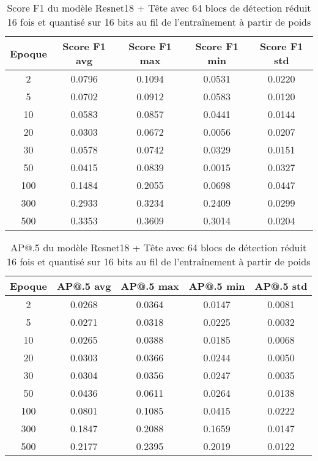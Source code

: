 \begin{table}[!ht]
    \caption{Score F1 du modèle Resnet18 + Tête avec 64 blocs de détection réduit 16 fois et quantisé sur 16 bits au fil de l'entraînement à partir de poids}
    \label{tab:qresnet18+head_64n_reduced_16x_f1score_16b_from_weights}
    \centering
    \begin{tabular}{ |c||c|c|c|c|  }
        \hline
        \rowcolor{gray!50}
        Epoque & Score F1 avg & Score F1 max & Score F1 min & Score F1 std\\
        \hline
        2 & 0.0796 & 0.1094 & 0.0531 & 0.0220\\
        5 & 0.0702 & 0.0912 & 0.0583 & 0.0120\\
        10 & 0.0583 & 0.0857 & 0.0441 & 0.0144\\
        20 & 0.0303 & 0.0672 & 0.0056 & 0.0207\\
        30 & 0.0578 & 0.0742 & 0.0329 & 0.0151\\
        50 & 0.0415 & 0.0839 & 0.0015 & 0.0327\\
        100 & 0.1484 & 0.2055 & 0.0698 & 0.0447\\
        300 & 0.2933 & 0.3234 & 0.2409 & 0.0299\\
        500 & 0.3353 & 0.3609 & 0.3014 & 0.0204\\
        \hline
    \end{tabular}
\end{table}

\begin{table}[!ht]
    \caption{AP@.5 du modèle Resnet18 + Tête avec 64 blocs de détection réduit 16 fois et quantisé sur 16 bits au fil de l'entraînement à partir de poids}
    \label{tab:qresnet18+head_64n_reduced_16x_ap50_16b_from_weights}
    \centering
    \begin{tabular}{ |c||c|c|c|c|  }
        \hline
        \rowcolor{gray!50}
        Epoque & AP@.5 avg & AP@.5 max & AP@.5 min & AP@.5 std\\
        \hline
        2 & 0.0268 & 0.0364 & 0.0147 & 0.0081\\
        5 & 0.0271 & 0.0318 & 0.0225 & 0.0032\\
        10 & 0.0265 & 0.0388 & 0.0185 & 0.0068\\
        20 & 0.0303 & 0.0366 & 0.0244 & 0.0050\\
        30 & 0.0304 & 0.0356 & 0.0247 & 0.0035\\
        50 & 0.0436 & 0.0611 & 0.0264 & 0.0138\\
        100 & 0.0801 & 0.1085 & 0.0415 & 0.0222\\
        300 & 0.1847 & 0.2088 & 0.1659 & 0.0147\\
        500 & 0.2177 & 0.2395 & 0.2019 & 0.0122\\
        \hline
    \end{tabular}
\end{table}

